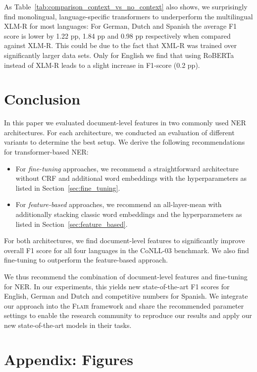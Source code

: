 \documentclass[11pt,a4paper]{article}
\begin{document}
As Table~\ref{tab:comparison_context_vs_no_context} also shows, we surprisingly find monolingual, language-specific transformers to underperform the multilingual XLM-R for most languages: For German, Dutch and Spanish the average F1 score is lower by 1.22 pp, 1.84 pp and 0.98 pp respectively when compared against XLM-R. This could be due to the fact that XML-R was trained over significantly larger data sets. Only for English we find that using RoBERTa \citep{liu2019roberta} instead of XLM-R leads to a slight increase in F1-score (0.2 pp).

\section{Conclusion}

In this paper we evaluated document-level features in two commonly used NER architectures. For each architecture, we conducted an evaluation of different variants to determine the best setup. We derive the following recommendations for transformer-based NER: 

\begin{itemize}
    \item For \textit{fine-tuning} approaches, we recommend a straightforward architecture without CRF and additional word embeddings with the hyperparameters as listed in Section~\ref{sec:fine_tuning}. 
    \item For \textit{feature-based} approaches, we recommend an all-layer-mean with additionally stacking classic word embeddings and the hyperparameters as listed in Section~\ref{sec:feature_based}.
\end{itemize}

\noindent
For both architectures, we find document-level features to significantly improve overall F1 score for all four languages in the CoNLL-03 benchmark. We also find fine-tuning to outperform the feature-based approach. 

We thus recommend the combination of document-level features and fine-tuning for NER. In our experiments, this yields new state-of-the-art F1 scores for English, German and Dutch and competitive numbers for Spanish. We integrate our approach into the \textsc{Flair} framework and share the recommended parameter settings to enable the research community to reproduce our results and apply our new state-of-the-art models in their tasks.




\newpage
\appendix
\section{Appendix: Figures} 
\end{document}
